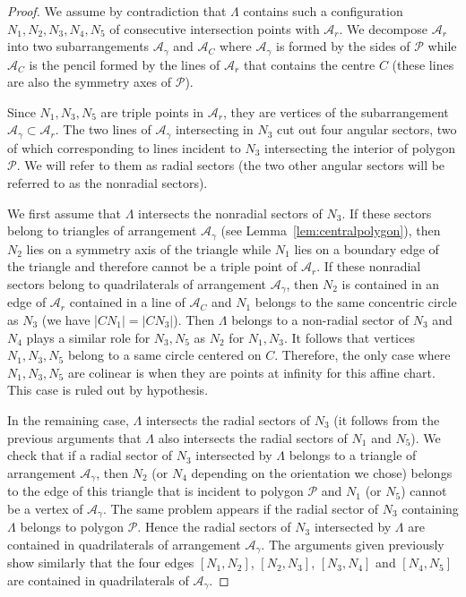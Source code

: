 \documentclass[a4paper,11pt,reqno]{amsart}
\theoremstyle{definition}
\theoremstyle{remark}
\theoremstyle{definition}
\theoremstyle{definition}
\theoremstyle{definition}
\numberwithin{equation}{section}
\begin{document}
\begin{proof}
We assume by contradiction that $\Lambda$ contains such a configuration $N_{1},N_{2},N_{3},N_{4},N_{5}$ of consecutive intersection points with $\mathcal{A}_{r}$. We decompose $\mathcal{A}_{r}$ into two subarrangements $\mathcal{A}_{\gamma}$ and $\mathcal{A}_{C}$ where $\mathcal{A}_{\gamma}$ is formed by the sides of $\mathcal{P}$ while $\mathcal{A}_{C}$ is the pencil formed by the lines of $\mathcal{A}_{r}$ that contains the centre $C$ (these lines are also the symmetry axes of $\mathcal{P}$).
\par
Since $N_{1},N_{3},N_{5}$ are triple points in $\mathcal{A}_{r}$, they are vertices of the subarrangement $\mathcal{A}_{\gamma} \subset \mathcal{A}_{r}$. The two lines of $\mathcal{A}_{\gamma}$ intersecting in $N_{3}$ cut out four angular sectors, two of which corresponding to lines incident to $N_{3}$ intersecting the interior of polygon $\mathcal{P}$. We will refer to them as radial sectors (the two other angular sectors will be referred to as the nonradial sectors).
\par
We first assume that $\Lambda$ intersects the nonradial sectors of $N_{3}$. If these sectors belong to triangles of arrangement $\mathcal{A}_{\gamma}$ (see Lemma~\ref{lem:centralpolygon}), then $N_{2}$ lies on a symmetry axis of the triangle while $N_{1}$ lies on a boundary edge of the triangle and therefore cannot be a triple point of $\mathcal{A}_{r}$. If these nonradial sectors belong to quadrilaterals of arrangement $\mathcal{A}_{\gamma}$, then $N_{2}$ is contained in an edge of $\mathcal{A}_{r}$ contained in a line of $\mathcal{A}_{C}$ and $N_{1}$ belongs to the same concentric circle as $N_{3}$ (we have |$CN_{1}|=|CN_{3}|$). Then $\Lambda$ belongs to a non-radial sector of $N_{3}$ and $N_{4}$ plays a similar role for $N_{3},N_{5}$ as $N_{2}$ for $N_{1},N_{3}$. It follows that vertices $N_{1},N_{3},N_{5}$ belong to a same circle centered on $C$. Therefore, the only case where $N_{1},N_{3},N_{5}$ are colinear is when they are points at infinity for this affine chart. This case is ruled out by hypothesis.
\par
In the remaining case, $\Lambda$ intersects the radial sectors of $N_{3}$ (it follows from the previous arguments that $\Lambda$ also intersects the radial sectors of $N_{1}$ and $N_{5}$). We check that if a radial sector of $N_{3}$ intersected by $\Lambda$ belongs to a triangle of arrangement $\mathcal{A}_{\gamma}$, then $N_{2}$ (or $N_{4}$ depending on the orientation we chose) belongs to the edge of this triangle that is incident to polygon $\mathcal{P}$ and $N_{1}$ (or $N_{5}$) cannot be a vertex of $\mathcal{A}_{\gamma}$. The same problem appears if the radial sector of $N_{3}$ containing $\Lambda$ belongs to polygon $\mathcal{P}$. Hence the radial sectors of $N_{3}$ intersected by $\Lambda$ are contained in quadrilaterals of arrangement $\mathcal{A}_{\gamma}$. The arguments given previously show similarly that the four edges $[N_{1},N_{2}]$, $[N_{2},N_{3}]$, $[N_{3},N_{4}]$ and $[N_{4},N_{5}]$ are contained in quadrilaterals of $\mathcal{A}_{\gamma}$. 

\end{proof}
\end{document}

